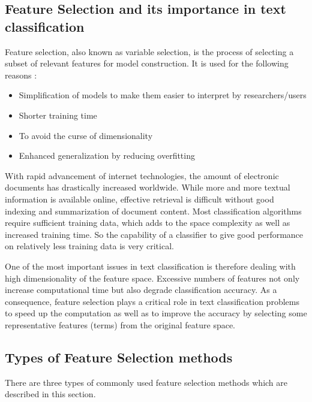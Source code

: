 \documentclass[a4paper, 14pt]{article}
\begin{document}
\subsection{Feature Selection and its importance in text classification}
\begin{justify}

Feature selection, also known as variable selection, is the process of selecting a subset of relevant features for model construction. It is used for the following reasons : 
\begin{itemize}

\item Simplification of models to make them easier to interpret by researchers/users
\item Shorter training time
\item To avoid the curse of dimensionality
\item Enhanced generalization by reducing overfitting\\

\end{itemize}

\justify
With rapid advancement of internet technologies, the amount of electronic documents has drastically increased worldwide. While more and more textual information is available online, effective retrieval is difficult without good indexing and summarization of document content. Most classification algorithms require sufficient training data, which adds to the space complexity as well as increased training time. So the capability of a classifier to give good performance on relatively less training data is very critical. 


\justify
One of the most important issues in text classification is therefore dealing with high dimensionality of the feature space. Excessive numbers of features not only increase computational time but also degrade classification accuracy. As a consequence, feature selection plays a critical role in text classification problems to speed up the computation as well as to improve the accuracy by selecting some representative features (terms) from the original feature space. 


\end{justify}

\newpage
\subsection{Types of Feature Selection methods}
\begin{justify}

\justify
There are three types of commonly used feature selection methods which are described in this section.
\end{justify}
\end{document}
